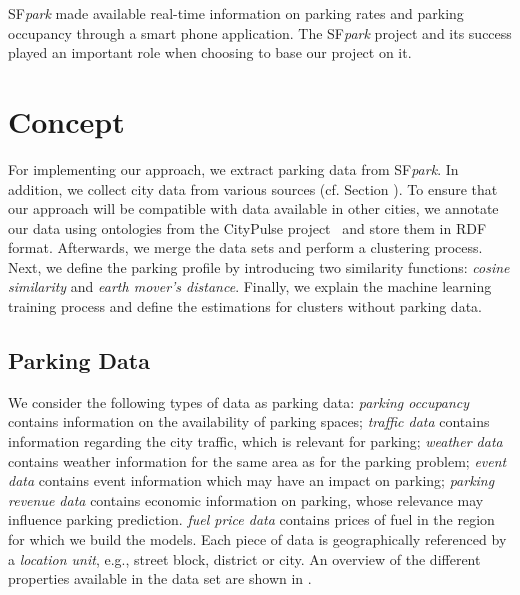 SF\textit{park} made available real-time information on parking rates and parking occupancy through a smart phone application. The SF\textit{park} project and its success played an important role when choosing to base our project on it.

\section{Concept}
For implementing our approach, we extract parking data from SF\textit{park}. In addition, we collect city data from various sources (cf. Section ). To ensure that our approach will be compatible with data available in other cities, we annotate our data using ontologies from the CityPulse project~\cite{city_pulse} and store them in RDF format. Afterwards, we merge the data sets and perform a clustering process. Next, we define the parking profile by introducing two similarity functions: \textit{cosine similarity} and \textit{earth mover's distance}.
Finally, we explain the machine learning training process and define the estimations for clusters without parking data.


\subsection{Parking Data}
We consider the following types of data as parking data: \textit{parking occupancy} contains information on the availability of parking spaces; \textit{traffic data} contains information regarding the city traffic, which is relevant for parking; \textit{weather data} contains weather information for the same area as for the parking problem; \textit{event data} contains event information which may have an impact on parking; \textit{parking revenue data} contains economic information on parking, whose relevance may influence parking prediction. \textit{fuel price data} contains prices of fuel in the region for which we build the models.
Each piece of data is geographically referenced by a \textit{location unit}, e.g., street block, district or city. 
An overview of the different properties available in the data set are shown in .

